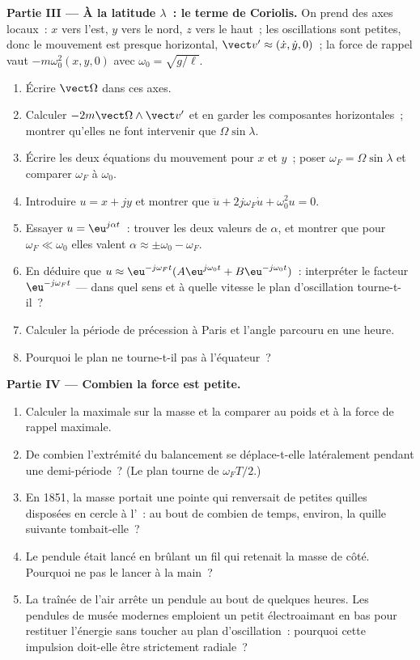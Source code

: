 \begin{problem}
\medskip
\noindent\textbf{Partie III --- À la latitude $\lambda$~: le terme de Coriolis.}
On prend des axes locaux~: $x$ vers l'est, $y$ vers le nord, $z$ vers le
haut~; les oscillations sont petites, donc le mouvement est presque
horizontal, $\vect v' \approx (\dot x, \dot y, 0)$~; la force de rappel
vaut $-m\omega_0^2(x, y, 0)$ avec $\omega_0 = \sqrt{g/\ell}$.
\begin{enumerate}[resume]
  \item Écrire $\vect\Omega$ dans ces axes.
  \item Calculer $-2m\vect\Omega\wedge\vect v'$ et en garder les composantes
        horizontales~; montrer qu'elles ne font intervenir que
        $\Omega\sin\lambda$.
  \item Écrire les deux équations du mouvement pour $x$ et $y$~; poser
        $\omega_F = \Omega\sin\lambda$ et comparer $\omega_F$ à $\omega_0$.
  \item Introduire $u = x + jy$ et montrer que $\ddot u + 2j\omega_F\dot u +
        \omega_0^2u = 0$.
  \item Essayer $u = \eu^{j\alpha t}$~: trouver les deux valeurs de
        $\alpha$, et montrer que pour $\omega_F \ll \omega_0$ elles valent
        $\alpha \approx \pm\omega_0
        - \omega_F$.
  \item En déduire que $u \approx \eu^{-j\omega_Ft}(A\eu^{j\omega_0t} + B\eu^{-j\omega_0t})$~:
        interpréter le facteur $\eu^{-j\omega_Ft}$ --- dans quel sens et à
        quelle vitesse le plan d'oscillation tourne-t-il~?
  \item Calculer la période de précession à Paris et l'angle parcouru en
        une heure.
  \item Pourquoi le plan ne tourne-t-il pas à l'équateur~?
\end{enumerate}

\medskip
\noindent\textbf{Partie IV --- Combien la force est petite.}
\begin{enumerate}[resume]
  \item Calculer la  maximale sur la masse et la
        comparer au poids et à la force de rappel maximale.
  \item De combien l'extrémité du balancement se déplace-t-elle
        latéralement pendant une demi-période~? (Le plan tourne de
        $\omega_FT/2$.)
  \item En 1851, la masse portait une pointe qui renversait de petites
        quilles disposées en cercle à l'~: au bout de combien de
        temps, environ, la quille suivante tombait-elle~?
  \item Le pendule était lancé en brûlant un fil qui retenait la masse de
        côté. Pourquoi ne pas le lancer à la main~?
  \item La traînée de l'air arrête un pendule au bout de quelques heures.
        Les pendules de musée modernes emploient un petit électroaimant
        en bas pour restituer l'énergie sans toucher au plan
        d'oscillation~: pourquoi cette impulsion doit-elle être
        strictement radiale~?
\end{enumerate}


\end{problem}
